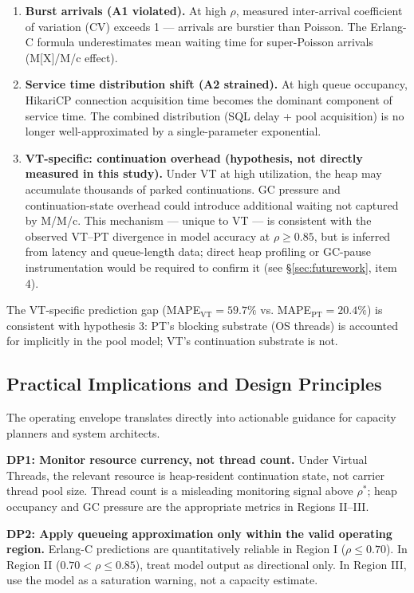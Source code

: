 \documentclass[10pt]{article}
\begin{document}
\begin{enumerate}
\item \textbf{Burst arrivals (A1 violated).} At high $\rho$, measured inter-arrival coefficient of variation (CV) exceeds 1 --- arrivals are burstier than Poisson. The Erlang-C formula underestimates mean waiting time for super-Poisson arrivals (M[X]/M/c effect).

\item \textbf{Service time distribution shift (A2 strained).} At high queue occupancy, HikariCP connection acquisition time becomes the dominant component of service time. The combined distribution (SQL delay + pool acquisition) is no longer well-approximated by a single-parameter exponential.

\item \textbf{VT-specific: continuation overhead (hypothesis, not directly measured in this study).} Under VT at high utilization, the heap may accumulate thousands of parked continuations. GC pressure and continuation-state overhead could introduce additional waiting not captured by M/M/c. This mechanism --- unique to VT --- is consistent with the observed VT--PT divergence in model accuracy at $\rho \geq 0.85$, but is inferred from latency and queue-length data; direct heap profiling or GC-pause instrumentation would be required to confirm it (see \S\ref{sec:futurework}, item 4).
\end{enumerate}

The VT-specific prediction gap (MAPE$_{\text{VT}} = 59.7\%$ vs. MAPE$_{\text{PT}} = 20.4\%$) is consistent with hypothesis 3: PT's blocking substrate (OS threads) is accounted for implicitly in the pool model; VT's continuation substrate is not.

\subsection{Practical Implications and Design Principles}

The operating envelope translates directly into actionable guidance for capacity planners and system architects.

\textbf{DP1: Monitor resource currency, not thread count.}
Under Virtual Threads, the relevant resource is heap-resident continuation state, not carrier thread pool size. Thread count is a misleading monitoring signal above $\rho^*$; heap occupancy and GC pressure are the appropriate metrics in Regions II--III.

\textbf{DP2: Apply queueing approximation only within the valid operating region.}
Erlang-C predictions are quantitatively reliable in Region I ($\rho \leq 0.70$). In Region II ($0.70 < \rho \leq 0.85$), treat model output as directional only. In Region III, use the model as a saturation warning, not a capacity estimate.
\end{document}
